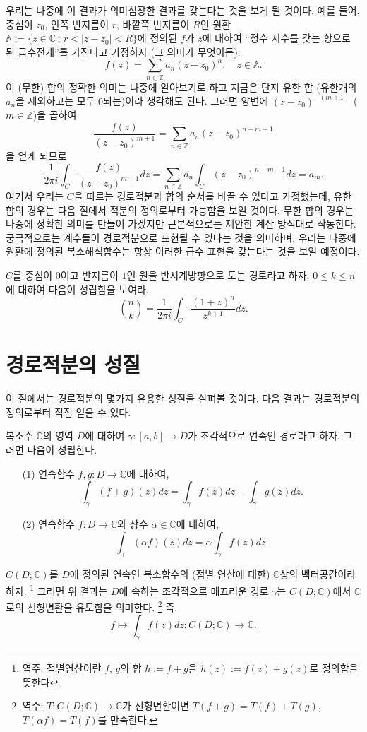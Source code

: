 우리는 나중에 이 결과가 의미심장한 결과를 갖는다는 것을 보게 될 것이다.
예를 들어, 
중심이 $z_0$, 안쪽 반지름이 $r$, 바깥쪽 반지름이 $R$인 
원환 $\mathbb A := \{ z\in\mathbb C \,:\, r<|z-z_0|<R \}$에 정의된
$f$가 $z$에 대하여 ``정수 지수를 갖는 항으로 된 급수전개''를 가진다고 가정하자 
(그 의미가 무엇이든).
\[
f(z) = \sum_{n\in\mathbb Z} a_n (z-z_0)^n, \quad z\in \mathbb A.
\]
이 (무한) 합의 정확한 의미는 나중에 알아보기로 하고
지금은 단지 유한 합 (유한개의 $a_n$을 제외하고는 모두 $0$되는)이라 생각해도 된다.
그러면  양변에 $(z-z_0)^{-(m+1)}$ ($m\in \mathbb Z$)을 곱하여 
\[
\dfrac{f(z)}{(z-z_0)^{m+1}} = \sum_{n\in\mathbb Z} a_n (z-z_0)^{n-m-1}
\]
을 얻게 되므로
\[
\dfrac1{2\pi i} \int_C \frac{f(z)}{(z-z_0)^{m+1}} dz
= \sum_{n\in\mathbb Z} a_n \int_C (z-z_0)^{n-m-1}dz = a_m.
\]
여기서 우리는 $C$을 따르는 경로적분과 합의 순서를 바꿀 수 있다고 가정했는데,
유한 합의 경우는 다음 절에서 적분의 정의로부터 가능함을 보일 것이다.
무한 합의 경우는 나중에 정확한 의미를 만들어 가겠지만 근본적으로는
제안한 계산 방식대로 작동한다.
궁극적으로는 계수들이 경로적분으로 표현될 수 있다는 것을 의미하며,
우리는 나중에 원환에 정의된 복소해석함수는 항상 이러한 급수 표현을 갖는다는 것을
보일 예정이다.

\begin{salt_exercise} \label{ex-3-5}
$C$를 중심이 $0$이고 반지름이 $1$인 원을 반시계방향으로 도는 경로라고 하자.
$0\le k \le n$에 대하여 다음이 성립함을 보여라.
\[
{n \choose k} = \dfrac1{2\pi i}\int_C \dfrac{(1+z)^n}{z^{k+1}} dz.
\]
\end{salt_exercise}

\section{경로적분의 성질}

이 절에서는 경로적분의 몇가지 유용한 성질을 살펴볼 것이다.
다음 결과는 경로적분의 정의로부터 직접 얻을 수 있다.

\begin{saltprop}{}{} \label{prop-3-1}
복소수 $\mathbb C$의 영역 $D$에 대하여
$\gamma: [a,b] \to D$가 조각적으로 연속인 경로라고 하자.
그러면 다음이 성립한다.
\begin{itemize}
\item[(1)] 연속함수 $f,g : D \to \mathbb C$에 대하여,
\[
\int_\gamma (f+g)(z) dz = \int_\gamma f(z)dz + \int_\gamma g(z)dz.
\]
\item[(2)] 연속함수 $f : D \to \mathbb C$와 상수 $\alpha\in\mathbb C$에 대하여,
\[
\int_\gamma  (\alpha f)(z)dz = \alpha \int_\gamma f(z)dz.
\]
\end{itemize}
\end{saltprop}
$C(D;\mathbb C)$를
$D$에 정의된 연속인 복소함수의 (점별 연산에 대한) $\mathbb C$상의 벡터공간이라 하자.
\footnote{역주: 점별연산이란 $f$, $g$의 합 $h:=f+g$을 $h(z):=f(z)+g(z)$로 정의함을 뜻한다}
그러면 위 결과는 $D$에 속하는 조각적으로 매끄러운 경로 $\gamma$는
$C(D;\mathbb C)$에서 $\mathbb C$로의 선형변환을 유도함을 의미한다.
\footnote{역주: $T: C(D;\mathbb C) \to \mathbb C$가 선형변환이면
$T(f+g) = T(f)+T(g)$, $T(\alpha f) = T(f)$를 만족한다. }
즉,
\[
f \mapsto \int_\gamma f(z)dz : C(D;\mathbb C) \to \mathbb C.
\]

